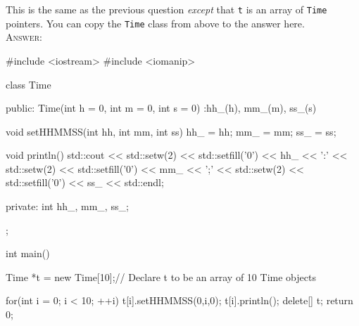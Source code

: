 \nextq
This is the same as the previous question \textit{except}
that \verb!t! is an array of \verb!Time! pointers.
You can copy the \verb!Time! class from above to the answer here.
\\
\textsc{Answer:}\vspace{-2mm}
\begin{answercode}
#include <iostream>
#include <iomanip>

class Time
{
public:
    Time(int h = 0, int m = 0, int s = 0)
    :hh_(h), mm_(m), ss_(s)
    {}

    void setHHMMSS(int hh, int mm, int ss)
    {
        hh_ = hh;
        mm_ = mm;
        ss_ = ss;
    }

    void println()
    {
        std::cout << std::setw(2) << std::setfill('0') << hh_ << ':'
                  << std::setw(2) << std::setfill('0') << mm_ << ';'
                  << std::setw(2) << std::setfill('0') << ss_ << std::endl;
    }

private:
int hh_, mm_, ss_;
};

int main()
{
    Time *t = new Time[10];// Declare t to be an array of 10 Time objects

    for(int i = 0; i < 10; ++i)
    {
        t[i].setHHMMSS(0,i,0);
        t[i].println();
    }
    delete[] t;
    return 0;
}

\end{answercode}

